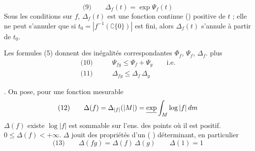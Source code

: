 \documentclass[11pt,a4paper]{article}
\begin{document}
\[
  \text{(9)}\qquad \Delta_f(t) = \exp\Psi_f(t)
\]
 Sous les conditions  sur $f$, $\Delta_f(t)$ est une fonction continue ()   positive de $t$ ; elle ne peut s'annuler que si $t_0 = |f^{-1}(\complement\{0\})|$ est fini, alors $\Delta_f(t)$ s'annule  à partir de $t_0$.

Les formules (5) donnent des inégalités correspondantes   $\Phi_f$, $\Psi_f$, $\Delta_f$.  plus  
\begin{align*}
  \text{(10)}\qquad & \Psi_{fg} \leq \Psi_f + \Psi_g \qquad\text{i.e.} \\
  \text{(11)}\qquad & \Delta_{fg} \leq \Delta_f\,\Delta_g
\end{align*}

. On pose, pour une fonction mesurable 
\[
  \text{(12)}\qquad \Delta(f) = \Delta_{|f|}(|M|) = \struck{\exp} \int_M \log|f|\, dm
\]
   $\Delta(f)$ existe   $\log|f|$ est sommable sur l'ens. des points où il est positif. $0 \leq \Delta(f) < +\infty$. $\Delta$ jouit des propriétés d'un ( ) déterminant, en particulier
\[
  \text{(13)}\qquad \Delta(fg) = \Delta(f)\,\Delta(g) \qquad \Delta(1) = 1
\]
\end{document}
